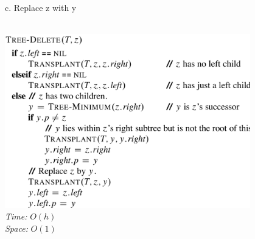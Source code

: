 {\begin{minipage}[t]{1\textwidth}
\begin{minipage}[t]{0.19\textwidth}
\begin{minipage}[t]{\textwidth}
            \quad c. Replace z with y
        \end{minipage}\\[4pt]
        \includegraphics[width=0.8\textwidth]{images/bst-delete.png}\\[2pt]
        \textit{Time:} \(O(h)\)\\
        \textit{Space:} \(O(1)\)
    \end{minipage}
    
    \vspace{2pt}
\end{minipage}} 